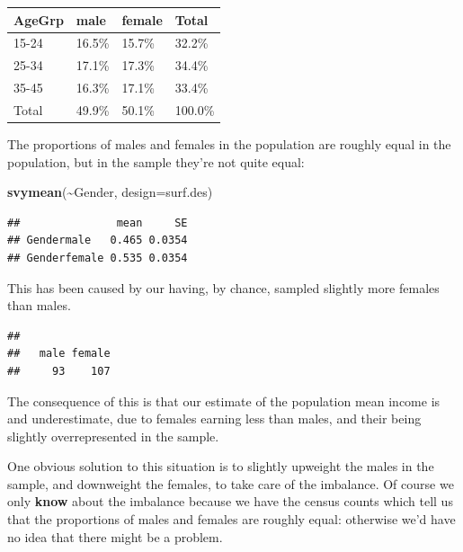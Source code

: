 \documentclass[
]{book}
\newenvironment{Shaded}{\begin{snugshade}}{\end{snugshade}}
\newcommand{\AttributeTok}[1]{\textcolor[rgb]{0.13,0.29,0.53}{#1}}
\newcommand{\FunctionTok}[1]{\textcolor[rgb]{0.13,0.29,0.53}{\textbf{#1}}}
\newcommand{\NormalTok}[1]{#1}
\newcommand{\SpecialCharTok}[1]{\textcolor[rgb]{0.81,0.36,0.00}{\textbf{#1}}}
\begin{document}
\begin{table}
\centering
\begin{tabular}[t]{l|l|l|l}
\hline
AgeGrp & male & female & Total\\
\hline
15-24 & 16.5\% & 15.7\% & 32.2\%\\
\hline
25-34 & 17.1\% & 17.3\% & 34.4\%\\
\hline
35-45 & 16.3\% & 17.1\% & 33.4\%\\
\hline
Total & 49.9\% & 50.1\% & 100.0\%\\
\hline
\end{tabular}
\end{table}

The proportions of males and females in the population are roughly equal in the population,
but in the sample they're not quite equal:

\begin{Shaded}
\begin{Highlighting}[]
\FunctionTok{svymean}\NormalTok{(}\SpecialCharTok{\textasciitilde{}}\NormalTok{Gender, }\AttributeTok{design=}\NormalTok{surf.des)}
\end{Highlighting}
\end{Shaded}

\begin{verbatim}
##               mean     SE
## Gendermale   0.465 0.0354
## Genderfemale 0.535 0.0354
\end{verbatim}

This has been caused by our having, by chance, sampled slightly more females than males.

\begin{Shaded}
\end{Shaded}

\begin{verbatim}
## 
##   male female 
##     93    107
\end{verbatim}

The consequence of this is that our estimate of the population mean income is
and underestimate, due to females earning less than males, and their being
slightly overrepresented in the sample.

One obvious solution to this situation is to slightly upweight the males in the sample, and downweight
the females, to take care of the imbalance. Of course we only \textbf{know} about the
imbalance because we have the census counts which tell us that the proportions of
males and females are roughly equal: otherwise we'd have no idea that there might be a problem.
\end{document}
